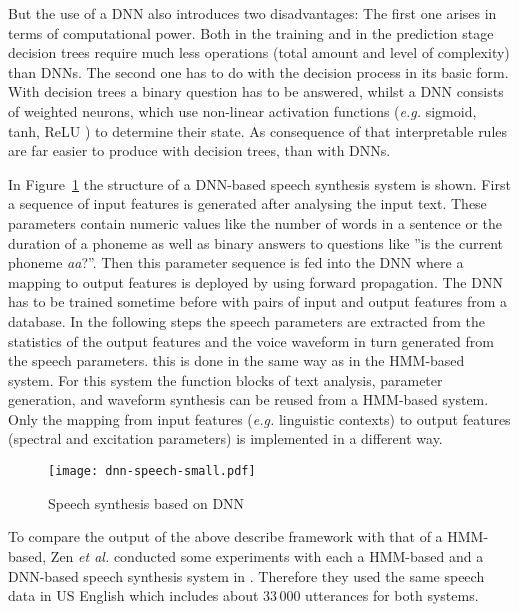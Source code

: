 But the use of a \ac{DNN} also introduces two disadvantages: The first one arises in terms of computational power. Both in the training and in the prediction stage decision trees require much less operations (total amount and level of complexity) than \acp{DNN}. The second one has to do with the decision process in its basic form. With decision trees a binary question has to be answered, whilst a \ac{DNN} consists of weighted neurons, which use non-linear activation functions (\textit{e.g.} sigmoid, tanh, ReLU \cite{chung:activation}) to determine their state. As consequence of that interpretable rules are far easier to produce with decision trees, than with \acp{DNN}.

In Figure~\ref{fig:dnnspeech} the structure of a \ac{DNN}-based speech synthesis system is shown. First a sequence of input features is generated after analysing the input text. These parameters contain numeric values like the number of words in a sentence or the duration of a phoneme as well as binary answers to questions like ''is the current phoneme \textit{aa}?''. Then this parameter sequence is fed into the \ac{DNN} where a mapping to output features is deployed by using forward propagation. The \ac{DNN} has to be trained sometime before with pairs of input and output features from a database. In the following steps the speech parameters are extracted from the statistics of the output features and the voice waveform in turn generated from the speech parameters. this is done in the same way as in the \ac{HMM}-based system. For this system the function blocks of text analysis, parameter generation, and waveform synthesis can be reused from a \ac{HMM}-based system. Only the mapping from input features (\textit{e.g.} linguistic contexts) to output features (spectral and excitation parameters) is implemented in a different way.

\begin{figure}[h]
	\texttt{[image: dnn-speech-small.pdf]}
	\caption{Speech synthesis based on \ac{DNN} \cite{zen:deepstatistical}}
	\label{fig:dnnspeech}
\end{figure}

To compare the output of the above describe framework with that of a \ac{HMM}-based, Zen \textit{et al.} conducted some experiments with each a \ac{HMM}-based and a \ac{DNN}-based speech synthesis system in \cite{zen:deepstatistical}. Therefore they used the same speech data in US English which includes about 33\,000 utterances for both systems. 

